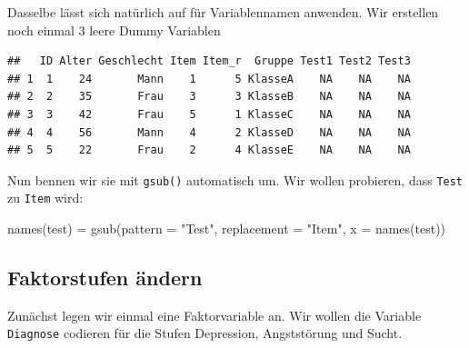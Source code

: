 \documentclass[
]{book}
\newenvironment{Shaded}{\begin{snugshade}}{\end{snugshade}}
\newcommand{\AttributeTok}[1]{\textcolor[rgb]{0.77,0.63,0.00}{#1}}
\newcommand{\ConstantTok}[1]{\textcolor[rgb]{0.00,0.00,0.00}{#1}}
\newcommand{\FunctionTok}[1]{\textcolor[rgb]{0.00,0.00,0.00}{#1}}
\newcommand{\NormalTok}[1]{#1}
\newcommand{\OtherTok}[1]{\textcolor[rgb]{0.56,0.35,0.01}{#1}}
\newcommand{\SpecialCharTok}[1]{\textcolor[rgb]{0.00,0.00,0.00}{#1}}
\newcommand{\StringTok}[1]{\textcolor[rgb]{0.31,0.60,0.02}{#1}}
\begin{document}
Dasselbe lässt sich natürlich auf für Variablennamen anwenden. Wir erstellen noch einmal 3 leere Dummy Variablen

\begin{Shaded}
\end{Shaded}

\begin{verbatim}
##   ID Alter Geschlecht Item Item_r  Gruppe Test1 Test2 Test3
## 1  1    24       Mann    1      5 KlasseA    NA    NA    NA
## 2  2    35       Frau    3      3 KlasseB    NA    NA    NA
## 3  3    42       Frau    5      1 KlasseC    NA    NA    NA
## 4  4    56       Mann    4      2 KlasseD    NA    NA    NA
## 5  5    22       Frau    2      4 KlasseE    NA    NA    NA
\end{verbatim}

Nun bennen wir sie mit \texttt{gsub()} automatisch um. Wir wollen probieren, dass \texttt{Test} zu \texttt{Item} wird:

\begin{Shaded}
\begin{Highlighting}[]
\FunctionTok{names}\NormalTok{(test) }\OtherTok{=} \FunctionTok{gsub}\NormalTok{(}\AttributeTok{pattern =} \StringTok{"Test"}\NormalTok{, }\AttributeTok{replacement =} \StringTok{"Item"}\NormalTok{, }\AttributeTok{x =} \FunctionTok{names}\NormalTok{(test))}
\end{Highlighting}
\end{Shaded}

\hypertarget{faktorstufen-uxe4ndern}{%
\subsection{Faktorstufen ändern}\label{faktorstufen-uxe4ndern}}

Zunächst legen wir einmal eine Faktorvariable an. Wir wollen die Variable \texttt{Diagnose} codieren für die Stufen Depression, Angststörung und Sucht.

\begin{Shaded}
\end{Shaded}
\end{document}
